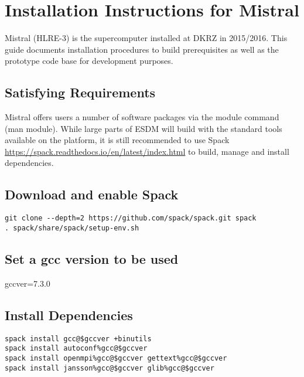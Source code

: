 \section{Installation Instructions for Mistral}%
\label{installation-instructions-for-mistral}

Mistral (HLRE-3) is the supercomputer installed at DKRZ in 2015/2016.
This guide documents installation procedures to build prerequisites as
well as the prototype code base for development purposes.

\subsection{Satisfying Requirements}%
\label{satisfying-requirements}

Mistral offers users a number of software packages via the module
command (man module). While large parts of ESDM will build with the
standard tools available on the platform, it is still recommended to use
Spack \url{https://spack.readthedocs.io/en/latest/index.html} to build,
manage and install dependencies.

\subsection{Download and enable Spack}%
\label{download-and-enable-spack}

\begin{lstlisting}
git clone --depth=2 https://github.com/spack/spack.git spack
. spack/share/spack/setup-env.sh
\end{lstlisting}

\subsection{Set a gcc version to be used}%
\label{set-a-gcc-version-to-be-used}

gccver=7.3.0

\subsection{Install Dependencies}%
\label{install-dependencies}

\begin{lstlisting}
spack install gcc@$gccver +binutils
spack install autoconf%gcc@$gccver
spack install openmpi%gcc@$gccver gettext%gcc@$gccver
spack install jansson%gcc@$gccver glib%gcc@$gccver
\end{lstlisting}

